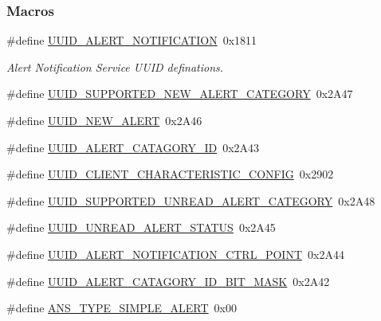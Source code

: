 \subsubsection*{Macros}
\begin{DoxyCompactItemize}
\item 
\#define \hyperlink{group___b_l_e___a_n_s_ga54c2c6106811e220432232e62bf3bf8d}{U\+U\+I\+D\+\_\+\+A\+L\+E\+R\+T\+\_\+\+N\+O\+T\+I\+F\+I\+C\+A\+T\+I\+ON}~0x1811
\begin{DoxyCompactList}\small\item\em Alert Notification Service U\+U\+ID definations. \end{DoxyCompactList}\item 
\#define \hyperlink{group___b_l_e___a_n_s_gae79df2e16529fe8fc52a4e49fd584123}{U\+U\+I\+D\+\_\+\+S\+U\+P\+P\+O\+R\+T\+E\+D\+\_\+\+N\+E\+W\+\_\+\+A\+L\+E\+R\+T\+\_\+\+C\+A\+T\+E\+G\+O\+RY}~0x2\+A47
\item 
\#define \hyperlink{group___b_l_e___a_n_s_ga89002dc91236106925dcb63f156cb7b9}{U\+U\+I\+D\+\_\+\+N\+E\+W\+\_\+\+A\+L\+E\+RT}~0x2\+A46
\item 
\#define \hyperlink{group___b_l_e___a_n_s_gabe97994cb8dac98f9dbbcd4465310f6a}{U\+U\+I\+D\+\_\+\+A\+L\+E\+R\+T\+\_\+\+C\+A\+T\+A\+G\+O\+R\+Y\+\_\+\+ID}~0x2\+A43
\item 
\#define \hyperlink{group___b_l_e___a_n_s_ga975962490e989073aec17b4c68a75c67}{U\+U\+I\+D\+\_\+\+C\+L\+I\+E\+N\+T\+\_\+\+C\+H\+A\+R\+A\+C\+T\+E\+R\+I\+S\+T\+I\+C\+\_\+\+C\+O\+N\+F\+IG}~0x2902
\item 
\#define \hyperlink{group___b_l_e___a_n_s_ga33eb9ad2d28d6721c6c147fc58e22fa3}{U\+U\+I\+D\+\_\+\+S\+U\+P\+P\+O\+R\+T\+E\+D\+\_\+\+U\+N\+R\+E\+A\+D\+\_\+\+A\+L\+E\+R\+T\+\_\+\+C\+A\+T\+E\+G\+O\+RY}~0x2\+A48
\item 
\#define \hyperlink{group___b_l_e___a_n_s_ga2ff36a16f151a482454279c0a8e5fa87}{U\+U\+I\+D\+\_\+\+U\+N\+R\+E\+A\+D\+\_\+\+A\+L\+E\+R\+T\+\_\+\+S\+T\+A\+T\+US}~0x2\+A45
\item 
\#define \hyperlink{group___b_l_e___a_n_s_ga3c96dbb307b54bdedc450bacbb1c840b}{U\+U\+I\+D\+\_\+\+A\+L\+E\+R\+T\+\_\+\+N\+O\+T\+I\+F\+I\+C\+A\+T\+I\+O\+N\+\_\+\+C\+T\+R\+L\+\_\+\+P\+O\+I\+NT}~0x2\+A44
\item 
\#define \hyperlink{group___b_l_e___a_n_s_ga099ff0035c1828b366f71c5c7a2bdd6c}{U\+U\+I\+D\+\_\+\+A\+L\+E\+R\+T\+\_\+\+C\+A\+T\+A\+G\+O\+R\+Y\+\_\+\+I\+D\+\_\+\+B\+I\+T\+\_\+\+M\+A\+SK}~0x2\+A42
\item 
\#define \hyperlink{group___b_l_e___a_n_s_ga118dc2a4a3258c5edac47225144d7696}{A\+N\+S\+\_\+\+T\+Y\+P\+E\+\_\+\+S\+I\+M\+P\+L\+E\+\_\+\+A\+L\+E\+RT}~0x00

\end{DoxyCompactItemize}
